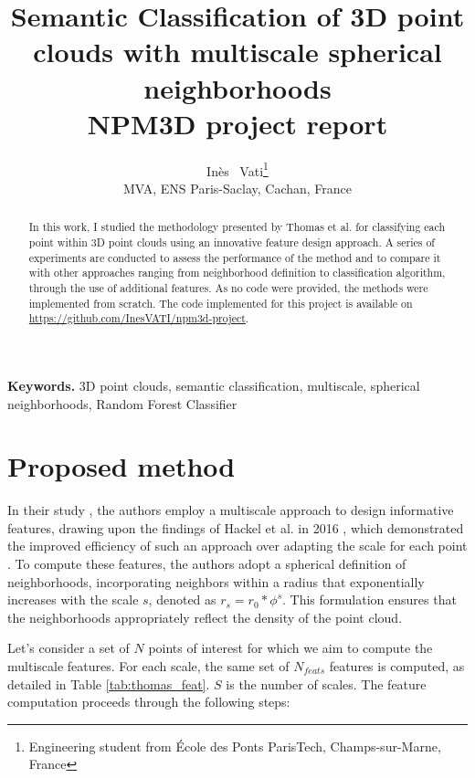 \documentclass{article}
\title{Semantic Classification of 3D point clouds with multiscale spherical neighborhoods \\ \vspace{.3cm}
\small{NPM3D project report}
}
\author{%
  Inès ~Vati\thanks{Engineering student from École des Ponts ParisTech, Champs-sur-Marne, France} \\
  MVA, ENS Paris-Saclay, Cachan, France\\
  \texttt{\email{ines.vati@eleves.enpc.fr}}
}
\date{}
\begin{document}
\maketitle

\begin{abstract}
    In this work, I studied the methodology presented by Thomas et al. \cite{thomas_semantic_2018} for classifying each point within 3D point clouds using an innovative feature design approach. 
    A series of experiments are conducted to assess the performance of the method and to compare it with other approaches ranging from neighborhood definition to classification algorithm, through the use of additional features.
    As no code were provided, the methods were implemented from scratch. The code implemented for this project is available on \url{https://github.com/InesVATI/npm3d-project}. 
\end{abstract}
\textbf{Keywords.} 3D point clouds, semantic classification, multiscale, spherical neighborhoods, Random Forest Classifier



\section{Proposed method}

In their study \cite{thomas_semantic_2018}, the authors employ a multiscale approach to design informative features, drawing upon the findings of Hackel et al. in 2016 \cite{hackel_fast_nodate}, which demonstrated the improved efficiency of such an approach over adapting the scale for each point \cite{weinmann_semantic_2015}. To compute these features, the authors adopt a spherical definition of neighborhoods, incorporating neighbors within a radius that exponentially increases with the scale $s$, denoted as $r_s = r_0 * \phi^s$. This formulation ensures that the neighborhoods appropriately reflect the density of the point cloud. 

Let's consider a set of $N$ points of interest for which we aim to compute the multiscale features. For each scale, the same set of $N_{feats}$ features is computed, as detailed in Table \ref{tab:thomas_feat}. $S$ is the number of scales. The feature computation proceeds through the following steps:
\end{document}
